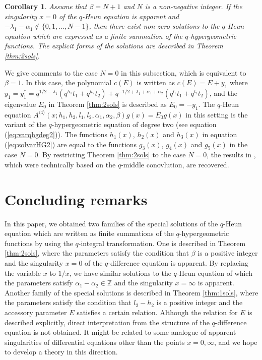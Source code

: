 \documentclass[12pt]{amsart}
\numberwithin{equation}{section}
\newtheorem{cor}[thm]{\bf Corollary}
\theoremstyle{definition}
\theoremstyle{remark}
\begin{document}
\begin{cor} 
Assume that $\beta = N +1 $ and $N$ is a non-negative integer.
If the singularity $x=0$ of the $q$-Heun equation is apparent and $-\lambda_{1} -\alpha _1 \not \in \{ 0,1,\dots ,N-1 \}$, then there exist non-zero solutions to the $q$-Heun equation which are expressed as a finite summation of the $q$-hypergeometric functions.
The explicit forms of the solutions are described in Theorem \ref{thm:2sols}.
\end{cor}

We give comments to the case $N=0$ in this subsection, which is equivalent to $\beta = 1$.
In this case, the polynomial $c(E)$ is written as $c(E) =E +y_1 $ where $y_1 = y_1^* = q^{1/2 - \lambda _{1} } (q^{h_{1}}t_{1} + q^{h_{2}}t_{2} ) + q^{- 1/2 + \lambda _{1} + \alpha _{1} + \alpha _{2} }( q^{l_{1}}t_{1} + q^{l_{2}}t_{2} ) $, and the eigenvalue $E_0$ in Theorem \ref{thm:2sols} is described as $E_0= -y_1 $.
The $q$-Heun equation $ A^{\langle 4 \rangle} (x; h_{1}, h_{2}, l_{1}, l_{2}, \alpha_{1}, \alpha_{2}, \beta) g (x) = E_0 g (x)  $ in this setting is the variant of the $q$-hypergeometric equation of degree two (see equation (\ref{eq:varqhgdeg2})).
The functions $h_1 (x)$, $h_2(x)$ and $h_3(x)$ in equation (\ref{eq:solvarHG2}) are equal to the functions $g_3(x)$, $g_4(x)$ and $g_5 (x)$ in the case $N=0$.
By restricting Theorem \ref{thm:2sols} to the case $N=0$, the results in \cite[\S 4.1.1]{AT}, which were technically based on the $q$-middle conovlution, are recovered.

\section{Concluding remarks} \label{sec:rem}

In this paper, we obtained two families of the special solutions of the $q$-Heun equation which are written as finite summations of the $q$-hypergeometric functions by using the $q$-integral transformation.
One is described in Theorem \ref{thm:2sols}, where the parameters satisfy the condition that $\beta $ is a positive integer and the singularity $x=0$ of the $q$-difference equation is apparent.
By replacing the variable $x$ to $1/x$, we have similar solutions to the $q$-Heun equation of which the parameters satisfy $\alpha _1 - \alpha _2 \in {\mathbb Z}$ and the singularity $x=\infty $ is apparent.
Another family of the special solutions is described in Theorem \ref{thm:1sols}, where the parameters satisfy the condition that $ l_{2} - h_{2} $ is a positive integer and the accessory parameter $E$ satisfies a certain relation.
Although the relation for $E$ is described explicitly, direct interpretation from the structure of the $q$-difference equation is not obtained.
It might be related to some analogue of apparent singularities of differential equations other than the points $x=0, \infty $, and we hope to develop a theory in this direction.
\end{document}

